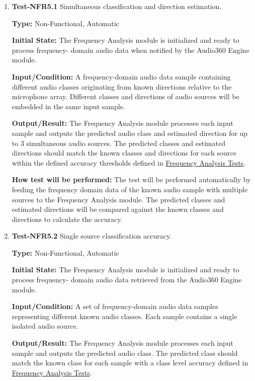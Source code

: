 \documentclass[12pt, titlepage]{article}
\begin{document}
\begin{enumerate}

\item{\textbf{Test-NFR5.1} Simultaneous classification and direction
estimation.\\}

\textbf{Type:} Non-Functional, Automatic

\textbf{Initial State:}
The Frequency Analysis module is initialized and ready to process frequency-
domain audio data when notified by the Audio360 Engine module.

\textbf{Input/Condition:}
A frequency-domain audio data sample containing different audio classes
originating from known directions relative to the microphone array. Different
classes and directions of audio sources will be embedded in the same input
sample.

\textbf{Output/Result:}
The Frequency Analysis module processes each input sample and outputs the
predicted audio class and estimated direction for up to 3 simultaneous audio
sources. The predicted classes and estimated directions should match the known
classes and directions for each source within the defined accuracy thresholds
defined in \hyperref[sec:freq-analysis-tests]{Frequency Analysis Tests}.

\textbf{How test will be performed:}
The test will be performed automatically by feeding the frequency domain data of
the known audio sample with multiple sources to the Frequency Analysis module.
The predicted classes and estimated directions will be compared against the
known classes and directions to calculate the accuracy.

\item{\textbf{Test-NFR5.2} Single source classification accuracy.\\}
 
\textbf{Type:} Non-Functional, Automatic

\textbf{Initial State:}
The Frequency Analysis module is initialized and ready to process frequency-
domain audio data retrieved from the Audio360 Engine module.

\textbf{Input/Condition:}
A set of frequency-domain audio data samples representing different known audio
classes. Each sample contains a single isolated audio source.

\textbf{Output/Result:}
The Frequency Analysis module processes each input sample and outputs the
predicted audio class. The predicted class should match the known class for each
sample with a class level accuracy defined in
\hyperref[sec:freq-analysis-tests]{Frequency Analysis Tests}.


\end{enumerate}
\end{document}
